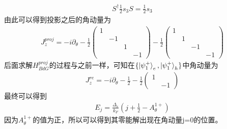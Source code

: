 \documentclass[22pt]{article}
\begin{document}
\begin{align}
			S^{\dagger}\frac{1}{2}s_3S=\frac{1}{2}s_3
\end{align}
由此可以得到投影之后的角动量为
\begin{align}
				J_z^{proj}=-i\partial_{\theta}-\frac{1}{2}
				\begin{pmatrix}
					1&&&\\
					&-1&&\\
					&&1&\\
					&&&-1
				\end{pmatrix}
			-\frac{1}{2}
			\begin{pmatrix}
				1&&&\\
				&1&&\\
				&&-1&\\
				&&&-1
			\end{pmatrix}
\end{align}
后面求解$H_{BdG}^{proj}$的过程与之前一样，可知在$\{\ket{\psi_{1}^{+}}_e,\ket{\psi_{1}^{+}}_h\}$中角动量为
\begin{align}
	J_z^{re}=-i\partial_{\theta}-\frac{1}{2}-\frac{1}{2}\begin{pmatrix}
		1&\\
		&-1
	\end{pmatrix}
\end{align}
最终可以得到
\begin{align}
	E_j=\frac{\Delta_e}{k_F}(j+\frac{1}{2}-A_{\theta}^{1+})
\end{align}
因为$A_{\theta}^{1+}$的值为正，所以可以得到其零能解出现在角动量j=0的位置。
\end{document}
